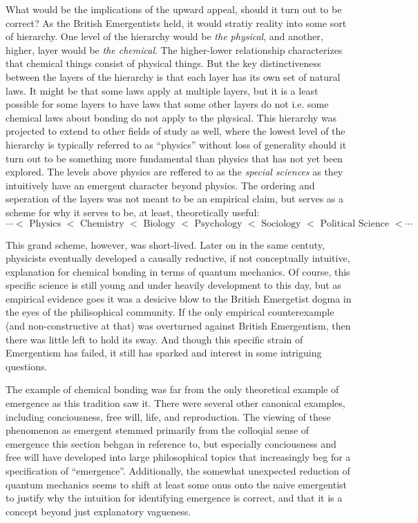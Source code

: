 \documentclass{article}
\newcommand{\tx}[1]{\text{#1}}
\newcommand{\ti}[1]{\textit{#1}}
\begin{document}
What would be the implications of the upward appeal, should it turn out to be correct? As the British Emergentists held, it would stratiy reality into some sort of hierarchy. One level of the hierarchy would be \ti{the physical}, and another, higher, layer would be \ti{the chemical}. The higher-lower relationship characterizes that chemical things consist of physical things. But the key distinctiveness between the layers of the hierarchy is that each layer has its own set of natural laws. It might be that some laws apply at multiple layers, but it is a least possible for some layers to have laws that some other layers do not i.e. some chemical laws about bonding do not apply to the physical. This hierarchy was projected to extend to other fields of study as well, where the lowest level of the hierarchy is typically referred to as ``physics'' without loss of generality should it turn out to be something more fundamental than physics that has not yet been explored. The levels above physics are reffered to as the \ti{special sciences} as they intuitively have an emergent character beyond physics. The ordering and seperation of the layers was not meant to be an empirical claim, but serves as a scheme for why it serves to be, at least, theoretically useful:
\[
    \cdots <
    \tx{ Physics } <
    \tx{ Chemistry } <
    \tx{ Biology } <
    \tx{ Psychology } <
    \tx{ Sociology } <
    \tx{ Political Science } <
    \cdots
\]

This grand scheme, however, was short-lived. Later on in the same centuty, physicists eventually developed a causally reductive, if not conceptually intuitive, explanation for chemical bonding in terms of quantum mechanics. Of course, this specific science is still young and under heavily development to this day, but as empirical evidence goes it was a desicive blow to the British Emergetist dogma in the eyes of the philisophical community. If the only empirical counterexample (and non-constructive at that) was overturned against British Emergentism, then there was little left to hold its sway. And though this specific strain of Emergentism has failed, it still has sparked and interest in some intriguing questions.

The example of chemical bonding was far from the only theoretical example of emergence as this tradition saw it. There were several other canonical examples, including conciousness, free will, life, and reproduction. The viewing of these phenomenon as emergent stemmed primarily from the colloqial sense of emergence this section behgan in reference to, but especially conciousness and free will have developed into large philosophical topics that increasingly beg for a specification of ``emergence''. Additionally, the somewhat unexpected reduction of quantum mechanics seems to shift at least some onus onto the naive emergentist to justify why the intuition for identifying emergence is correct, and that it is a concept beyond just explanatory vagueness.
\end{document}
